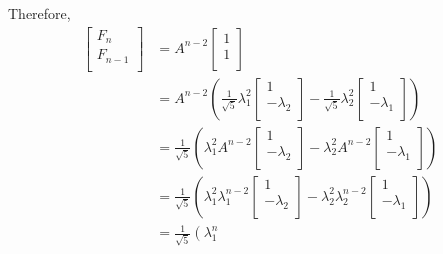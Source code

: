 \documentclass{article}
\begin{document}
\begin{example}
  Therefore,
  \begin{align*}
    \begin{bmatrix}
      F_n \\F_{n-1}\\
    \end{bmatrix} & = A^{n-2}
    \begin{bmatrix}
      1 \\1\\
    \end{bmatrix}                                                         \\
                    & = A^{n-2}\left(\frac{1}{\sqrt{5}} \lambda_1^2
    \begin{bmatrix}
      1 \\-\lambda_2\\
    \end{bmatrix} - \frac{1}{\sqrt{5}}\lambda_2^2
    \begin{bmatrix}
      1          \\
      -\lambda_1 \\
    \end{bmatrix}\right)                                                   \\
                    & = \frac{1}{\sqrt{5}}\left(\lambda_1^2A^{n-2}
    \begin{bmatrix}
      1 \\-\lambda_2\\
    \end{bmatrix} -\lambda_2^2A^{n-2}
    \begin{bmatrix}
      1 \\-\lambda_1\\
    \end{bmatrix}\right)                                                   \\
                    & = \frac{1}{\sqrt{5}}\left(\lambda_1^2\lambda_1^{n-2}
    \begin{bmatrix}
      1 \\-\lambda_2\\
    \end{bmatrix} -\lambda_2^2\lambda_2^{n-2}
    \begin{bmatrix}
      1 \\-\lambda_1\\
    \end{bmatrix}\right)                                                   \\
                    & = \frac{1}{\sqrt{5}}\left(\lambda_1^{n}

\end{align*}
\end{example}
\end{document}

